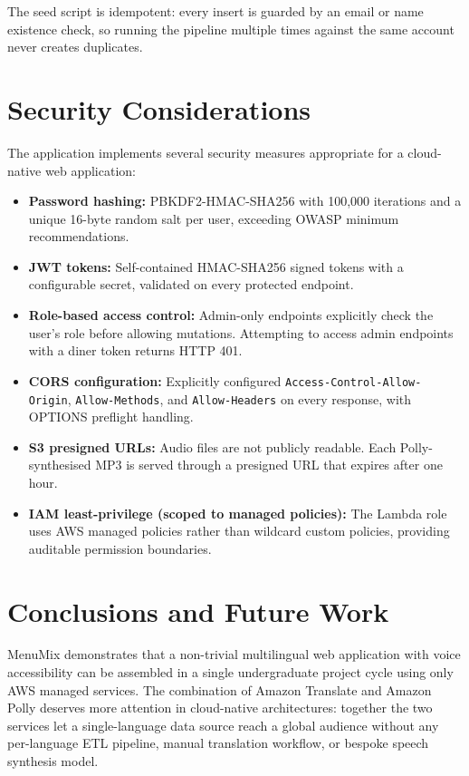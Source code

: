 \documentclass[conference]{IEEEtran}
\begin{document}
The seed script is idempotent: every insert is guarded by an email or name existence check, so running the pipeline multiple times against the same account never creates duplicates.

\section{Security Considerations}

The application implements several security measures appropriate for a cloud-native web application:

\begin{itemize}[leftmargin=*]
    \item \textbf{Password hashing:} PBKDF2-HMAC-SHA256 with 100,000 iterations and a unique 16-byte random salt per user, exceeding OWASP minimum recommendations.
    \item \textbf{JWT tokens:} Self-contained HMAC-SHA256 signed tokens with a configurable secret, validated on every protected endpoint.
    \item \textbf{Role-based access control:} Admin-only endpoints explicitly check the user's role before allowing mutations. Attempting to access admin endpoints with a diner token returns HTTP 401.
    \item \textbf{CORS configuration:} Explicitly configured \texttt{Access-Control-Allow-Origin}, \texttt{Allow-Methods}, and \texttt{Allow-Headers} on every response, with OPTIONS preflight handling.
    \item \textbf{S3 presigned URLs:} Audio files are not publicly readable. Each Polly-synthesised MP3 is served through a presigned URL that expires after one hour.
    \item \textbf{IAM least-privilege (scoped to managed policies):} The Lambda role uses AWS managed policies rather than wildcard custom policies, providing auditable permission boundaries.
\end{itemize}

\section{Conclusions and Future Work}

MenuMix demonstrates that a non-trivial multilingual web application with voice accessibility can be assembled in a single undergraduate project cycle using only AWS managed services. The combination of Amazon Translate and Amazon Polly deserves more attention in cloud-native architectures: together the two services let a single-language data source reach a global audience without any per-language ETL pipeline, manual translation workflow, or bespoke speech synthesis model.
\end{document}

